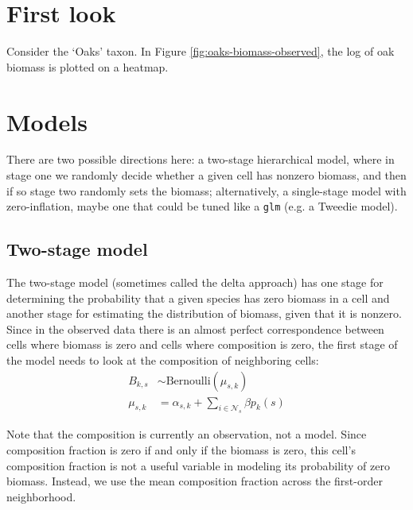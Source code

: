 \documentclass[authoryear, review, 11pt]{elsarticle}
\begin{document}
\section{First look}
Consider the `Oaks' taxon. In Figure \ref{fig:oaks-biomass-observed}, the log of oak biomass is plotted on a heatmap. \\


\section{Models}


There are two possible directions here: a two-stage hierarchical model, where in stage one we randomly decide whether a given cell has nonzero biomass, and then if so stage two randomly sets the biomass; alternatively, a single-stage model with zero-inflation, maybe one that could be tuned like a \verb!glm! (e.g. a Tweedie model).\\


\subsection{Two-stage model}
The two-stage model (sometimes called the delta approach) has one stage for determining the probability that a given species has zero biomass in a cell and another stage for estimating the distribution of biomass, given that it is nonzero. Since in the observed data there is an almost perfect correspondence between cells where biomass is zero and cells where composition is zero, the first stage of the model needs to look at the composition of neighboring cells:\*
\begin{equation*}
  \begin{split}
    B_{k,s} &\sim \text{Bernoulli}(\mu_{s,k})\\
    \mu_{s, k} &= \alpha_{s,k} + \sum\limits_{i \in \mathcal{N}_s} \beta p_k(s)
  \end{split}
\end{equation*}

Note that the composition is currently an observation, not a model. Since composition fraction is zero if and only if the biomass is zero, this cell's composition fraction is not a useful variable in modeling its probability of zero biomass. Instead, we use the mean composition fraction across the first-order neighborhood.
\end{document}

